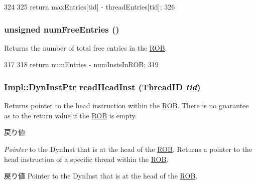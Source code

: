 \begin{DoxyCode}
324 {
325     return maxEntries[tid] - threadEntries[tid];
326 }
\end{DoxyCode}
\hypertarget{classROB_a028971a565aca048c67ea1c36a6a9d51}{
\subsubsection[{numFreeEntries}]{\setlength{\rightskip}{0pt plus 5cm}unsigned numFreeEntries ()}}
\label{classROB_a028971a565aca048c67ea1c36a6a9d51}
Returns the number of total free entries in the \hyperlink{classROB}{ROB}. 


\begin{DoxyCode}
317 {
318     return numEntries - numInstsInROB;
319 }
\end{DoxyCode}
\hypertarget{classROB_a5c156e82f6912abd14c61c6cc9b8000a}{
\subsubsection[{readHeadInst}]{\setlength{\rightskip}{0pt plus 5cm}Impl::DynInstPtr readHeadInst ({\bf ThreadID} {\em tid})}}
\label{classROB_a5c156e82f6912abd14c61c6cc9b8000a}
Returns pointer to the head instruction within the \hyperlink{classROB}{ROB}. There is no guarantee as to the return value if the \hyperlink{classROB}{ROB} is empty. 
\begin{DoxyRetVals}{戻り値}
\item[{\em Pointer}]to the DynInst that is at the head of the \hyperlink{classROB}{ROB}. Returns a pointer to the head instruction of a specific thread within the \hyperlink{classROB}{ROB}. \end{DoxyRetVals}
\begin{DoxyReturn}{戻り値}
Pointer to the DynInst that is at the head of the \hyperlink{classROB}{ROB}. 
\end{DoxyReturn}



